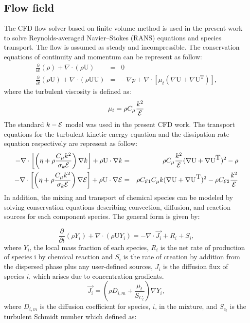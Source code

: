 \documentclass[a4paper]{jpconf}
\begin{document}
\subsection{Flow field}
The CFD flow solver based on finite volume method is used in the present work to solve Reynolds-averaged
Navier–Stokes (RANS) equations and species transport. The flow is assumed as steady and incompressible. The
conservation equations of continuity and momentum can be represent as follow:
\begin{eqnarray}
\label{eq1}
	\frac{\partial }{\partial t}(\rho )+ \nabla \cdot (\rho \mbox{U})&=&0\\
	\label{eq2}
	\frac{\partial }{\partial t}(\rho \mbox{U})+\nabla \cdot (\rho \mbox{U}\mbox{U})&=&-\nabla p+\nabla \cdot [\mu_t(\nabla \mbox{U} +\nabla \mbox{U}^{\mbox{T}})],
\end{eqnarray}
where the turbulent viscosity is defined as:
\begin{equation}
\label{eq3}
\mu_t=\rho  C_{\mu} \frac{k^2}{{\cal E}}
\end{equation}
The standard $k-{\cal E}$ model was used in the present CFD work. The transport equations for the turbulent
kinetic energy equation and the dissipation rate equation respectively are represent as follow:
\begin{eqnarray} 
\label{eq4}
-\nabla \cdot \left[ \left(\eta + \rho\frac{C_\mu k^2}{\sigma_k {\cal E}}\right)\nabla k \right]+\rho \mbox{U}\cdot\nabla k
&=&\rho C_\mu \frac{k^2}{{\cal E}}(\nabla \mbox{U}+\nabla \mbox{U}^{\mbox{T}})^2 - \rho\\
-\nabla \cdot \left[ \left(\eta + \rho\frac{C_\mu k^2}{\sigma_k {\cal E}}\right)\nabla {\cal E} \right]+\rho \mbox{U}\cdot\nabla {\cal E} &=& \rho C_{{\cal E} 1} C_\mu k (\nabla \mbox{U} +\nabla \mbox{U}^{\mbox{T}})^2 -\rho C_{{\cal E} 2}\frac{k^2}{{\cal E }}
\end{eqnarray}
In addition, the mixing and transport of chemical species can be modeled by solving conservation
equations describing convection, diffusion, and reaction sources for each component species. The general form is given by: 

\begin{equation}
 \frac{\partial }{\partial t}(\rho Y_i)+\nabla \cdot(\rho \mbox{U} Y_i)=-\nabla\cdot\vec{J_i}+R_i +S_i,
\end{equation}
where $Y_i$, the local mass fraction of each species, $R_i$ is the net rate of production of species i by chemical reaction and $S_i$ is the rate of creation by addition from the dispersed phase plus any user-defined sources, $J_i$ is the diffusion flux of species $i$, which arises due to concentration gradients.
\begin{equation}
\vec{J_i}=\left(\rho D_{i,m} + \frac{\mu_t}{S_{C_t}}\right)\nabla Y_i,
\end{equation}
where $D_{i,m}$ is the diffusion coefficient for species, $i$, in the
mixture, and $S_{c_t}$ is the turbulent Schmidt number which
defined as:
\end{document}
